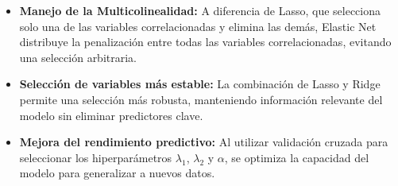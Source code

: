 \documentclass[
  letterpaper,
  DIV=11,
  numbers=noendperiod]{scrreprt}
\begin{document}
\begin{tcolorbox}[enhanced jigsaw, breakable, toprule=.15mm, bottomtitle=1mm, coltitle=black, colbacktitle=quarto-callout-note-color!10!white, titlerule=0mm, opacitybacktitle=0.6, bottomrule=.15mm, toptitle=1mm, title=\textcolor{quarto-callout-note-color}{\faInfo}\hspace{0.5em}{Propiedades Clave}, arc=.35mm, rightrule=.15mm, opacityback=0, colframe=quarto-callout-note-color-frame, leftrule=.75mm, left=2mm, colback=white]

\begin{itemize}
\item
  \textbf{Manejo de la Multicolinealidad:} A diferencia de Lasso, que
  selecciona solo una de las variables correlacionadas y elimina las
  demás, Elastic Net distribuye la penalización entre todas las
  variables correlacionadas, evitando una selección arbitraria.
\item
  \textbf{Selección de variables más estable:} La combinación de Lasso y
  Ridge permite una selección más robusta, manteniendo información
  relevante del modelo sin eliminar predictores clave.
\item
  \textbf{Mejora del rendimiento predictivo:} Al utilizar validación
  cruzada para seleccionar los hiperparámetros \(\lambda_1\),
  \(\lambda_2\) y \(\alpha\), se optimiza la capacidad del modelo para
  generalizar a nuevos datos.
\end{itemize}

\end{tcolorbox}
\end{document}
